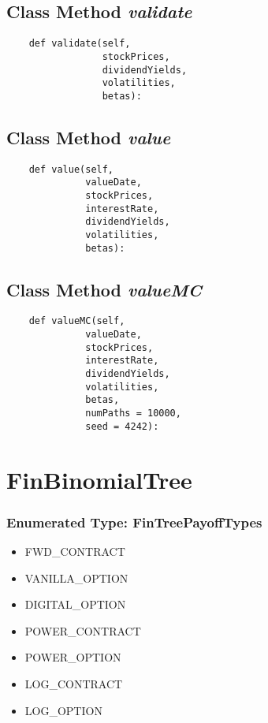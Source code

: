 \documentclass[twoside,11pt]{book}
\begin{document}
\subsection{Class Method {\it validate}}


\begin{lstlisting}
    def validate(self, 
                 stockPrices,
                 dividendYields,
                 volatilities, 
                 betas):
\end{lstlisting}

\subsection{Class Method {\it value}}


\begin{lstlisting}
    def value(self,
              valueDate,
              stockPrices,
              interestRate,
              dividendYields,
              volatilities, 
              betas):
\end{lstlisting}

\subsection{Class Method {\it valueMC}}


\begin{lstlisting}
    def valueMC(self,
              valueDate,
              stockPrices,
              interestRate,
              dividendYields,
              volatilities,
              betas,
              numPaths = 10000,
              seed = 4242):
\end{lstlisting}

\newpage
\section{FinBinomialTree}

\subsubsection{Enumerated Type: FinTreePayoffTypes}
\begin{itemize}
\item{FWD\_CONTRACT}
\item{VANILLA\_OPTION}
\item{DIGITAL\_OPTION}
\item{POWER\_CONTRACT}
\item{POWER\_OPTION}
\item{LOG\_CONTRACT}
\item{LOG\_OPTION}
\end{itemize}
\end{document}
